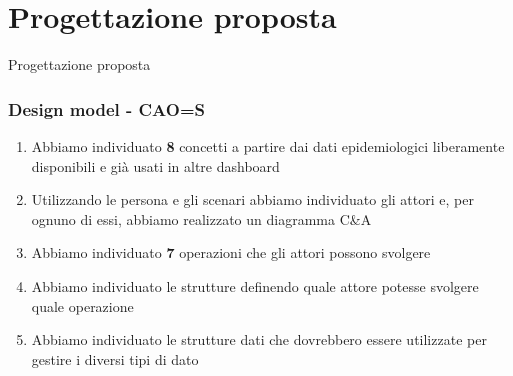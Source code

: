 \documentclass[handout]{beamer}
\begin{document}
	\section{Progettazione proposta}
		\begin{frame}
			\centering
			\begin{Huge}
				Progettazione proposta
			\end{Huge}
		\end{frame}
		\begin{frame}
			\frametitle{Design model - CAO=S}
			\begin{enumerate}[<+->]
				\item Abbiamo individuato \textbf{8} concetti a partire dai dati epidemiologici liberamente disponibili e già usati in altre dashboard\\
				\item Utilizzando le persona e gli scenari abbiamo individuato gli attori e, per ognuno di essi, abbiamo realizzato un diagramma C\&A\\
				\item Abbiamo individuato \textbf{7} operazioni che gli attori possono svolgere\\
				\item Abbiamo individuato le strutture definendo quale attore potesse svolgere quale operazione\\
				\item Abbiamo individuato le strutture dati che dovrebbero essere utilizzate per gestire i diversi tipi di dato\\
			\end{enumerate}
		\end{frame}
\end{document}
